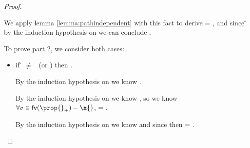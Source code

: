 \begin{lemma}
\begin{proof}
\begin{case}[T-App]
\begin{itemize}
\begin{subcase}[B-BetaClosure]
\begin{itemize}
             We apply lemma \ref{lemma:pathindependent} with this fact
             to derive
                          { {\y{}}}
                          = 
             ,
                      and since
                      { {\y{}}}{\v{}}
                      by the induction hypothesis on 
                      we can conclude 
                      .
         \end{itemize}


         To prove part 2, we consider both cases:
         \begin{itemize}
           \item if \v{} $\not=$ \false\ (or \nil) then \satisfies{\openv{}}{\thenprop{\prop{}}}.

                              By the induction hypothesis on 
                              we know
                        {}.

                        By the induction hypothesis on {}
                        we know
,
so we know $\forall v \in \fv{\thenprop{\prop{}}} - \x{}$,
                              {} = {}.

                              By the induction hypothesis on  we know {}
                              and since {}
                              then 
                             = .


\end{itemize}
\end{subcase}
\end{itemize}
\end{case}
\end{proof}
\end{lemma}
